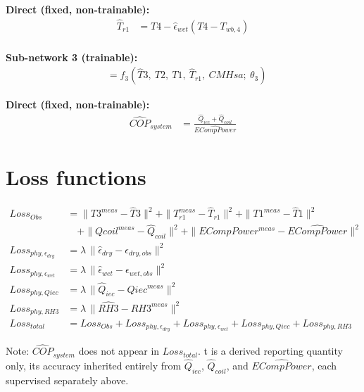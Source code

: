 \documentclass[11pt]{article}
\begin{document}
\noindent\textbf{Direct (fixed, non-trainable):}
\begin{align}
\hat T_{r1} &= T4 - \hat\epsilon_{wet}(T4-T_{wb,4})\\
\end{align}

\noindent\textbf{Sub-network 3 (trainable):}
\begin{align}
[\hat T1,\ \hat Q_{coil},\ \hat{ECompPower}] &= f_3(\hat T3,\ T2,\ T1,\ \hat T_{r1},\ CMHsa;\ \theta_3)
\end{align}

\noindent\textbf{Direct (fixed, non-trainable):}
\begin{align}
\hat{COP}_{system} &= \frac{\hat Q_{iec}+\hat Q_{coil}}{\hat{ECompPower}}
\end{align}

\section*{Loss functions}

\begin{align}
Loss_{Obs} &= \|T3^{meas}-\hat T3\|^2 + \|T_{r1}^{meas}-\hat T_{r1}\|^2 + \|T1^{meas}-\hat T1\|^2 \nonumber\\
&\quad + \|Qcoil^{meas}-\hat Q_{coil}\|^2 + \|ECompPower^{meas}-\hat{ECompPower}\|^2 \\[4pt]
Loss_{phy,\epsilon_{dry}} &= \lambda\,\|\hat\epsilon_{dry}-\epsilon_{dry,obs}\|^2 \\
Loss_{phy,\epsilon_{wet}} &= \lambda\,\|\hat\epsilon_{wet}-\epsilon_{wet,obs}\|^2 \\
Loss_{phy,Qiec} &= \lambda\,\|\hat Q_{iec}-Qiec^{meas}\|^2 \\
Loss_{phy,RH3} &= \lambda\,\|\widehat{RH3}-RH3^{meas}\|^2 \\[4pt]
Loss_{total} &= Loss_{Obs} + Loss_{phy,\epsilon_{dry}} + Loss_{phy,\epsilon_{wet}} + Loss_{phy,Qiec} + Loss_{phy,RH3}
\end{align}

\noindent Note: $\hat{COP}_{system}$ does not appear in $Loss_{total}$. t is a derived
reporting quantity only, its accuracy inherited entirely from $\hat Q_{iec}$, $\hat Q_{coil}$, and $\hat{ECompPower}$, each supervised separately above.
\end{document}
